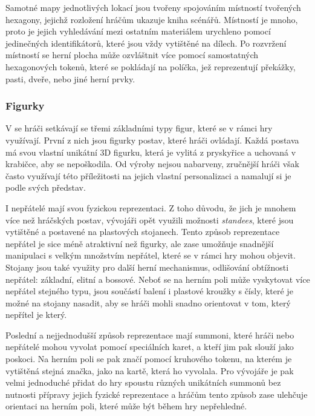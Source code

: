 Samotné mapy jednotlivých lokací jsou tvořeny spojováním místností tvořených hexagony, jejichž rozložení hráčům ukazuje kniha scénářů. Místností je mnoho, proto je jejich vyhledávání mezi ostatním materiálem urychleno pomocí jedinečných identifikátorů, které jsou vždy vytištěné na dílech. Po rozvržení místností se herní plocha může ozvláštnit více pomocí samostatných hexagonových tokenů, které se pokládají na políčka, jež reprezentují překážky, pasti, dveře, nebo jiné herní prvky.

\subsubsection*{Figurky}
\label{subsubsec:gh_comp_figures}

V  se hráči setkávají se třemi základními typy figur, které se v rámci hry využívají. První z nich jsou figurky postav, které hráči ovládají. Každá postava má svou vlastní unikátní 3D figurku, která je vylitá z pryskyřice a uchovaná v krabičce, aby se nepoškodila. Od výroby nejsou nabarveny, zručnější hráči však často využívají této příležitosti na jejich vlastní personalizaci a namalují si je podle svých představ.

I nepřátelé mají svou fyzickou reprezentaci. Z toho důvodu, že jich je mnohem více než hráčských postav, vývojáři opět využili možnosti \textit{standees}, které jsou vytištěné a postavené na plastových stojanech. Tento způsob reprezentace nepřátel je sice méně atraktivní než figurky, ale zase umožňuje snadnější manipulaci s velkým množstvím nepřátel, které se v rámci hry mohou objevit. Stojany jsou také využity pro další herní mechanismus, odlišování obtížnosti nepřátel: základní, elitní a bossové. Neboť se na herním poli může vyskytovat více nepřátel stejného typu, jsou součástí balení i plastové kroužky s čísly, které je možné na stojany nasadit, aby se hráči mohli snadno orientovat v tom, který nepřítel je který.

Poslední a nejjednodušší způsob reprezentace mají summoni, které hráči nebo nepřátelé mohou vyvolat pomocí speciálních karet, a kteří jim pak slouží jako poskoci. Na herním poli se pak značí pomocí kruhového tokenu, na kterém je vytištěná stejná značka, jako na kartě, která ho vyvolala. Pro vývojáře je pak velmi jednoduché přidat do hry spoustu různých unikátních summonů bez nutnosti přípravy jejich fyzické reprezentace a hráčům tento způsob zase ulehčuje orientaci na herním poli, které může být během hry nepřehledné.

